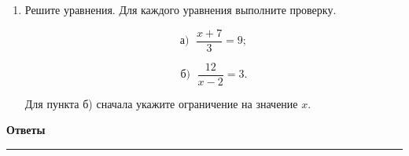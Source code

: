 \documentclass[a4paper,12pt]{article}
\newcommand{\sectiontitle}[1]{%
    \vspace{0.4em}
    {\Large\bfseries\textcolor{darkaccent}{#1}}\par
    \vspace{0.2em}
    \noindent
    \textcolor{accent}{\rule{\linewidth}{0.7pt}}\par
    \vspace{0.35em}
}
\begin{document}
\begin{enumerate}
Во всех группах должно быть
одинаковое максимально возможное
число человек.

Определите:

\begin{itemize}

\item
сколько человек будет в одной группе;

\item
сколько получится групп мальчиков;

\item
сколько получится групп девочек.

\end{itemize}


\item
Решите уравнения.
Для каждого уравнения выполните проверку.

\[
\text{а) }\;
\frac{x+7}{3}=9;
\]

\[
\text{б) }\;
\frac{12}{x-2}=3.
\]

Для пункта б) сначала укажите ограничение
на значение $x$.

\end{enumerate}


\clearpage

\sectiontitle{Ответы}
\end{document}
